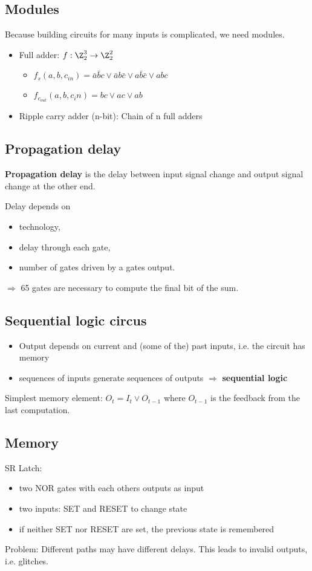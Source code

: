 \documentclass{article}
\begin{document}
\subsection{Modules}
Because building circuits for many inputs is complicated, we need modules.
\begin{itemize}
	\item Full adder: $f:\Z_2^3\to\Z_2^2$\begin{itemize}
		      \item $f_s(a,b,c_{in})=\bar{a}\bar{b}c\vee \bar{a}b\bar{c} \vee a\bar{b}\bar{c} \vee abc$
		      \item $f_{c_{out}}(a,b,c_in)=bc\vee ac\vee ab$
	      \end{itemize}
	\item Ripple carry adder (n-bit): Chain of n full adders
\end{itemize}
\subsection{Propagation delay}
\begin{definition}
	\textbf{Propagation delay} is the delay between input signal
	change and output signal change at the other end.
\end{definition}
Delay depends on
\begin{itemize}
	\item technology,
	\item delay through each gate,
	\item number of gates driven by a gates output.
\end{itemize}
$\Rightarrow$ 65 gates are necessary to compute the final bit of the sum.
\subsection{Sequential logic circus}
\begin{itemize}
	\item Output depends on current and (some of the) past inputs, i.e. the circuit has memory
	\item sequences of inputs generate sequences of outputs $\Rightarrow$ \textbf{sequential logic}
\end{itemize}
Simplest memory element: $O_t = I_t \vee O_{t-1}$ where $O_{t-1}$ is the feedback from the last
computation.
\subsection{Memory}
SR Latch:
\begin{itemize}
	\item two NOR gates with each others outputs as input
	\item two inputs: SET and RESET to change state
	\item if neither SET nor RESET are set, the previous state is remembered
\end{itemize}
Problem: Different paths may have different delays. This leads to invalid outputs, i.e. glitches.
\end{document}

